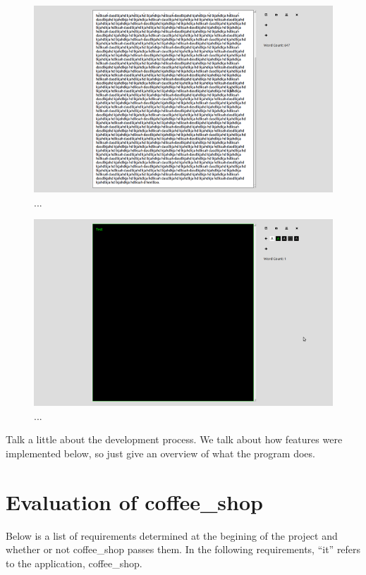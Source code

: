 \documentclass[10pt]{article}
\begin{document}
\begin{figure}
   \centering
      \includegraphics[width=130mm]{images/coffee_shop2.png}
   \caption{...}
\end{figure}

\begin{figure}
   \centering
      \includegraphics[width=130mm]{images/coffee_shop3.png}
   \caption{...}
\end{figure}

Talk a little about the development process. We talk about how features were implemented below, so just give an overview of what the program does.

\section{Evaluation of coffee\_shop}

Below is a list of requirements determined at the begining of the project and whether or not coffee\_shop passes them. In the following requirements, ``it'' refers to the application, coffee\_shop.
\end{document}
